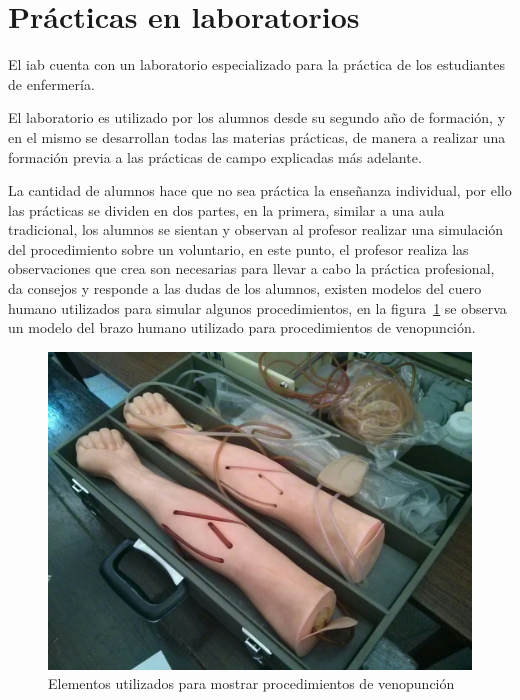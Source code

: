 \section{Prácticas en laboratorios}
\label{sec:practica_lab}

El \Gls{iab} cuenta con un laboratorio especializado para la práctica de los
estudiantes de enfermería.

El laboratorio es utilizado por los alumnos desde su segundo año de formación, y
en el mismo se desarrollan todas las materias prácticas, de manera a realizar
una formación previa a las prácticas de campo explicadas más adelante.

La cantidad de alumnos hace que no sea práctica la enseñanza individual, por ello
las prácticas se dividen en dos partes, en la primera, similar a una aula
tradicional, los alumnos se sientan y observan al profesor realizar una
simulación del procedimiento sobre un voluntario, en este punto, el profesor
realiza las observaciones que crea son necesarias para llevar a cabo la práctica
profesional, da consejos y responde a las dudas de los alumnos, existen modelos
del cuero humano utilizados para simular algunos procedimientos, en la
figura~\ref{fig:iab_veno} se observa un modelo del brazo humano utilizado para
procedimientos de venopunción.

\begin{figure}[h!t] 
\centering 
\includegraphics[scale=0.2,natwidth=100,natheight=100]{problema/iab_sala_2.jpg}
\caption{Elementos utilizados para mostrar procedimientos de venopunción}
\label{fig:iab_veno}
\end{figure}

